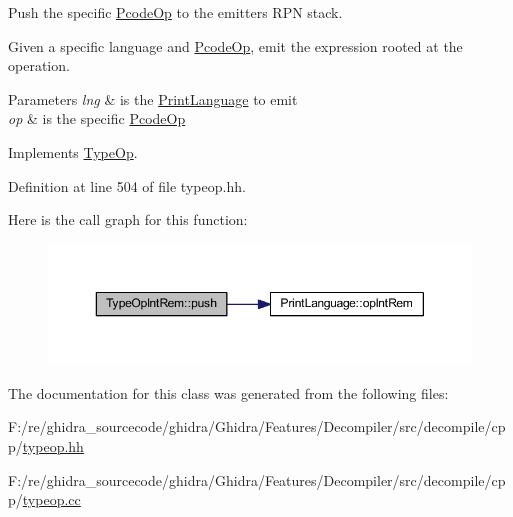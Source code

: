 Push the specific \mbox{\hyperlink{class_pcode_op}{Pcode\+Op}} to the emitter\textquotesingle{}s R\+PN stack. 

Given a specific language and \mbox{\hyperlink{class_pcode_op}{Pcode\+Op}}, emit the expression rooted at the operation. 
\begin{DoxyParams}{Parameters}
{\em lng} & is the \mbox{\hyperlink{class_print_language}{Print\+Language}} to emit \\
\hline
{\em op} & is the specific \mbox{\hyperlink{class_pcode_op}{Pcode\+Op}} \\
\hline
\end{DoxyParams}


Implements \mbox{\hyperlink{class_type_op_ac9c9544203ed74dabe6ac662b653b2af}{Type\+Op}}.



Definition at line 504 of file typeop.\+hh.

Here is the call graph for this function\+:
\nopagebreak
\begin{figure}[H]
\begin{center}
\leavevmode
\includegraphics[width=350pt]{class_type_op_int_rem_a3e100cddbe74736acf29d6706426ced0_cgraph}
\end{center}
\end{figure}


The documentation for this class was generated from the following files\+:\begin{DoxyCompactItemize}
\item 
F\+:/re/ghidra\+\_\+sourcecode/ghidra/\+Ghidra/\+Features/\+Decompiler/src/decompile/cpp/\mbox{\hyperlink{typeop_8hh}{typeop.\+hh}}\item 
F\+:/re/ghidra\+\_\+sourcecode/ghidra/\+Ghidra/\+Features/\+Decompiler/src/decompile/cpp/\mbox{\hyperlink{typeop_8cc}{typeop.\+cc}}\end{DoxyCompactItemize}
